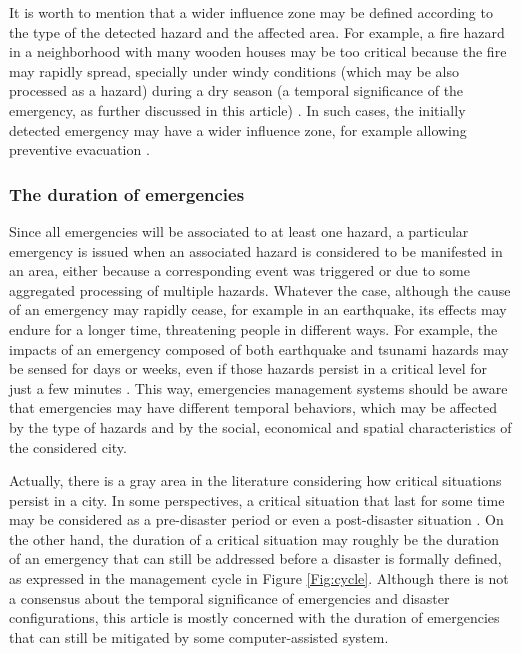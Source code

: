 \begin{refsection}
It is worth to mention that a wider influence zone may be defined according to the type of the detected hazard and the affected area. For example, a fire hazard in a neighborhood with many wooden houses may be too critical because the fire may rapidly spread, specially under windy conditions (which may be also processed as a hazard) during a dry season (a temporal significance of the emergency, as further discussed in this article) \cite{iotFire2}. In such cases, the initially detected emergency may have a wider influence zone, for example allowing preventive evacuation \cite{evacuation}.

\subsubsection{The duration of emergencies}

Since all emergencies will be associated to at least one hazard, a particular emergency is issued when an associated hazard is considered to be manifested in an area, either because a corresponding event was triggered or due to some aggregated processing of multiple hazards. Whatever the case, although the cause of an emergency may rapidly cease, for example in an earthquake, its effects may endure for a longer time, threatening people in different ways. For example, the impacts of an emergency composed of both earthquake and tsunami hazards may be sensed for days or weeks, even if those hazards persist in a critical level for just a few minutes \cite{tsunami1}. This way, emergencies management systems should be aware that emergencies may have different temporal behaviors, which may be affected by the type of hazards and by the social, economical and spatial characteristics of the considered city.

Actually, there is a gray area in the literature considering how critical situations persist in a city. In some perspectives, a critical situation that last for some time may be considered as a pre-disaster  
period \cite{citiesdisasters2,citiesdisasters3} or even a post-disaster situation \cite{citiesdisasters4,citiesdisasters5}. On the other hand, the duration of a critical situation may roughly be the duration of an emergency that can still be addressed before a disaster is formally defined, as expressed in the management cycle in Figure \ref{Fig:cycle}. Although there is not a consensus about the temporal significance of emergencies and disaster configurations, this article is mostly concerned with the duration of emergencies that can still be mitigated by some computer-assisted system.  


\end{refsection}
